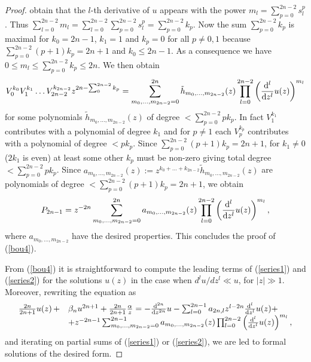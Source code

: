 \documentclass{amsart}
\theoremstyle{definition}
\theoremstyle{remark}
\theoremstyle{remark}
\begin{document}
\begin{proof}
obtain that the $l$-th derivative of $u$ appears with the power
$m_l=\sum_{p=0}^{2n-2}s_l^p$. Thus $\sum_{l=0}^{2n-2}m_l=
\sum_{l=0}^{2n-2}\sum_{p=0}^{2n-2}s_l^p=\sum_{p=0}^{2n-2} k_p$. Now
the sum $\sum_{p=0}^{2n-2} k_p$ is maximal for  $k_0=2n-1$, $k_1=1$
and $k_p=0$ for all $p\neq 0,1$ because $\sum_{p=0}^{2n-2}(p+1) k_p=
2n+1$ and $k_0\leq 2n-1$. As a consequence we have
$0\leq m_l\leq \sum_{p=0}^{2n-2} k_p\leq 2n$.
We then obtain
$$
V_0^{k_0} V_1^{k_1}\dots V_{2n-2}^{k_{2n-2}}
z^{2n-\sum_0^{2n-2} k_p}=
\sum_{m_0,\dots,m_{2n-2}=0}^{2n}
\tilde h_{m_0,\dots,m_{2n-2}}(z)\prod_{l=0}^{2n-2}
\left({{\rm d}^l\over{\rm d} z^l} u(z)\right)^{m_l}
$$
for some polynomials $\tilde h_{m_0,\dots,m_{2n-2}}(z)$ of degree
$<\sum_{p=0}^{2n-2}p k_p$. In fact $V_1^{k_1}$ contributes with a
polynomial of degree $k_1$ and for $p\neq1$ each $V_p^{k_p}$ contributes
with a polynomial of degree $<p k_p$.
Since $\sum_{p=0}^{2n-2}(p+1)k_p=2n+1$,
for $k_1\neq0$ ($2k_1$ is even)
at least some other $k_p$ must be non-zero giving total
degree $<\sum_{p=0}^{2n-2}p k_p$.
Since $a_{m_0,\dots,m_{2n-2}}(z):=
z^{k_0+\dots+k_{2n-2}}\tilde h_{m_0,\dots,m_{2n-2}}(z)$ are
polynomials of degree $<\sum_{p=0}^{2n-2}(p+1) k_p=2n+1$, we
obtain
$$
P_{2n-1}=z^{-2n} \sum_{m_0,\dots,m_{2n-2}=0}^{2n}
a_{m_0,\dots,m_{2n-2}}(z)\prod_{l=0}^{2n-2}
\left({{\rm d}^l\over{\rm d} z^l} u(z)\right)^{m_l},
$$
where $a_{m_0,\dots,m_{2n-2}}$ have the desired properties.
This concludes the proof of (\ref{bou4}).

From (\ref{bou4}) it is straightforward to compute the leading terms
of (\ref{series1}) and (\ref{series2}) for the solutions $u(z)$
in the case when $d^lu/dz^l\ll u$, for $|z|\gg1$.
Moreover, rewriting the equation as
\begin{equation*}
\begin{array}{ll}
{2n\over 2n+1} u(z)\, +&
\beta_n u^{2n+1}+{2n\over 2n+1}{\alpha\over z}=
-{{\rm d}^{2n}\over{\rm d} z^{2n}} u
-\sum_{l=0}^{2n-1} a_{2n,l}z^{l-2n}
{{\rm d}^l\over{\rm d} z^l} u(z)+\\
&+z^{-2n-1}\sum_{m_0,\dots,m_{2n-2}=0}^{2n-1}
a_{m_0,\dots,m_{2n-2}}(z)\prod_{l=0}^{2n-2}
\left({{\rm d}^l\over{\rm d} z^l} u(z)\right)^{m_l},\\
\end{array}
\end{equation*}
and iterating on partial sums of (\ref{series1}) or (\ref{series2}),
we are led to formal solutions of the desired form.
\end{proof}
\end{document}
